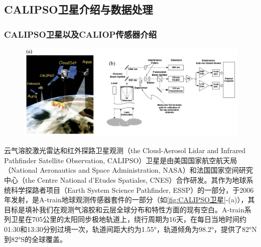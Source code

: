 \subsection{CALIPSO卫星介绍与数据处理}
\subsubsection{CALIPSO卫星以及CALIOP传感器介绍}
\begin{figure}[htbp]
    \centering
    \includegraphics[width=\linewidth]{figure/第二章用图/图2-CALIPSO.jpg}
\end{figure}

云气溶胶激光雷达和红外探路卫星观测（the Cloud-Aerosol Lidar and Infrared Pathfinder Satellite Observation, CALIPSO）卫星是由美国国家航空航天局（National Aeronautics and Space Administration, NASA）和法国国家空间研究中心（the Centre National d’Etudes Spatiales, CNES）合作研发。\cite{winker2003accounting,CALIPSO_2009}其作为地球系统科学探路者项目（Earth System Science Pathfinder, ESSP）的一部分，于2006年发射，是A-train地球观测传感器套件的一部分（如\autoref{fig:CALIPSO卫星}-(a)），其目标是填补我们在观测气溶胶和云层全球分布和特性方面的现有空白。\cite{CALIPSO_2009,winker2003accounting}A-train系列卫星在705公里的太阳同步极地轨道上，绕行周期为16天，在每日当地时间约01:30和13:30分别过境一次，轨道间距大约为1.55°，轨道倾角为98.2°，提供了82°N到82°S的全球覆盖。\cite{stephens2002cloudsat,CALIPSO_2009}

